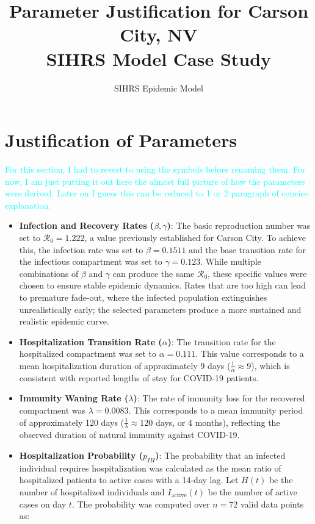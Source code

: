 \documentclass[11pt]{article}
\title{Parameter Justification for Carson City, NV\\SIHRS Model Case Study}
\author{SIHRS Epidemic Model}
\date{}
\begin{document}
\maketitle

\section{Justification of Parameters}
\label{JoP}

\textcolor{cyan}{For this section, I had to revert to using the symbols before renaming them. For now, I am just putting it out here the almost full picture of how the parameters were derived. Later on I guess this can be reduced to 1 or 2 paragraph of concise explanation.}

\begin{itemize}

    \item \textbf{Infection and Recovery Rates ($\beta, \gamma$)}: The basic reproduction number was set to $\mathcal{R}_0 = 1.222$, a value previously established for Carson City. To achieve this, the infection rate was set to $\beta = 0.1511$ and the base transition rate for the infectious compartment was set to $\gamma = 0.123$. While multiple combinations of $\beta$ and $\gamma$ can produce the same $\mathcal{R}_0$, these specific values were chosen to ensure stable epidemic dynamics. Rates that are too high can lead to premature fade-out, where the infected population extinguishes unrealistically early; the selected parameters produce a more sustained and realistic epidemic curve.

    \item \textbf{Hospitalization Transition Rate ($\alpha$)}: The transition rate for the hospitalized compartment was set to $\alpha = 0.111$. This value corresponds to a mean hospitalization duration of approximately 9 days ($\frac{1}{\alpha}\approx 9$), which is consistent with reported lengths of stay for COVID-19 patients.

    \item \textbf{Immunity Waning Rate ($\lambda$)}: The rate of immunity loss for the recovered compartment was $\lambda = 0.0083$. This corresponds to a mean immunity period of approximately 120 days ($ \frac{1}{\lambda} \approx 120$ days, or 4 months), reflecting the observed duration of natural immunity against COVID-19.

    \item \textbf{Hospitalization Probability ($p_{IH}$)}: The probability that an infected individual requires hospitalization was calculated as the mean ratio of hospitalized patients to active cases with a 14-day lag. Let $H(t)$ be the number of hospitalized individuals and $I_{\text{active}}(t)$ be the number of active cases on day $t$. The probability was computed over $n=72$ valid data points as:


\end{itemize}
\end{document}
